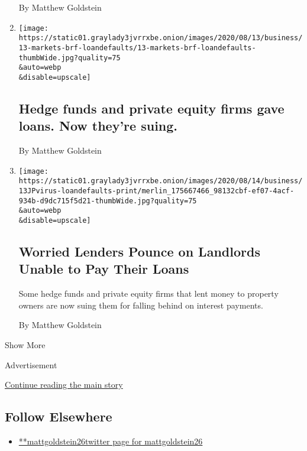 \begin{enumerate}
  By Matthew Goldstein
\item
  \href{/2020/08/13/business/hedge-funds-and-private-equity-firms-gave-loans-now-theyre-suing.html}{}

  \texttt{[image: https://static01.graylady3jvrrxbe.onion/images/2020/08/13/business/13-markets-brf-loandefaults/13-markets-brf-loandefaults-thumbWide.jpg?quality=75\\\&auto=webp\\\&disable=upscale]}

  \hypertarget{hedge-funds-and-private-equity-firms-gave-loans-now-theyre-suing}{%
  \subsection{Hedge funds and private equity firms gave loans. Now
  they're
  suing.}\label{hedge-funds-and-private-equity-firms-gave-loans-now-theyre-suing}}

  By Matthew Goldstein
\item
  \href{/2020/08/13/business/commercial-landlord-loan-foreclosure.html}{}

  \texttt{[image: https://static01.graylady3jvrrxbe.onion/images/2020/08/14/business/13JPvirus-loandefaults-print/merlin\_175667466\_98132cbf-ef07-4acf-934b-d9dc715f5d21-thumbWide.jpg?quality=75\\\&auto=webp\\\&disable=upscale]}

  \hypertarget{worried-lenders-pounce-on-landlords-unable-to-pay-their-loans}{%
  \subsection{Worried Lenders Pounce on Landlords Unable to Pay Their
  Loans}\label{worried-lenders-pounce-on-landlords-unable-to-pay-their-loans}}

  Some hedge funds and private equity firms that lent money to property
  owners are now suing them for falling behind on interest payments.

  By Matthew Goldstein
\end{enumerate}

Show More

Advertisement

\protect\hyperlink{after-mid2}{Continue reading the main story}

\hypertarget{follow-elsewhere}{%
\subsection{Follow Elsewhere}\label{follow-elsewhere}}

\begin{itemize}
\tightlist
\item
  \href{https://twitter.com/mattgoldstein26}{**mattgoldstein26twitter
  page for mattgoldstein26}
\end{itemize}

